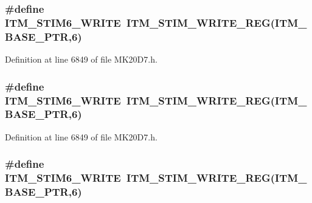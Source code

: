 \subsubsection[{\texorpdfstring{I\+T\+M\+\_\+\+S\+T\+I\+M6\+\_\+\+W\+R\+I\+TE}{ITM_STIM6_WRITE}}]{\setlength{\rightskip}{0pt plus 5cm}\#define I\+T\+M\+\_\+\+S\+T\+I\+M6\+\_\+\+W\+R\+I\+TE~{\bf I\+T\+M\+\_\+\+S\+T\+I\+M\+\_\+\+W\+R\+I\+T\+E\+\_\+\+R\+EG}({\bf I\+T\+M\+\_\+\+B\+A\+S\+E\+\_\+\+P\+TR},6)}\hypertarget{group___i_t_m___register___accessor___macros_gab5f100af2978bf54186d5754e9676f5d}{}\label{group___i_t_m___register___accessor___macros_gab5f100af2978bf54186d5754e9676f5d}


Definition at line 6849 of file M\+K20\+D7.\+h.

\subsubsection[{\texorpdfstring{I\+T\+M\+\_\+\+S\+T\+I\+M6\+\_\+\+W\+R\+I\+TE}{ITM_STIM6_WRITE}}]{\setlength{\rightskip}{0pt plus 5cm}\#define I\+T\+M\+\_\+\+S\+T\+I\+M6\+\_\+\+W\+R\+I\+TE~{\bf I\+T\+M\+\_\+\+S\+T\+I\+M\+\_\+\+W\+R\+I\+T\+E\+\_\+\+R\+EG}({\bf I\+T\+M\+\_\+\+B\+A\+S\+E\+\_\+\+P\+TR},6)}\hypertarget{group___i_t_m___register___accessor___macros_gab5f100af2978bf54186d5754e9676f5d}{}\label{group___i_t_m___register___accessor___macros_gab5f100af2978bf54186d5754e9676f5d}


Definition at line 6849 of file M\+K20\+D7.\+h.

\subsubsection[{\texorpdfstring{I\+T\+M\+\_\+\+S\+T\+I\+M6\+\_\+\+W\+R\+I\+TE}{ITM_STIM6_WRITE}}]{\setlength{\rightskip}{0pt plus 5cm}\#define I\+T\+M\+\_\+\+S\+T\+I\+M6\+\_\+\+W\+R\+I\+TE~{\bf I\+T\+M\+\_\+\+S\+T\+I\+M\+\_\+\+W\+R\+I\+T\+E\+\_\+\+R\+EG}({\bf I\+T\+M\+\_\+\+B\+A\+S\+E\+\_\+\+P\+TR},6)}\hypertarget{group___i_t_m___register___accessor___macros_gab5f100af2978bf54186d5754e9676f5d}{}\label{group___i_t_m___register___accessor___macros_gab5f100af2978bf54186d5754e9676f5d}


